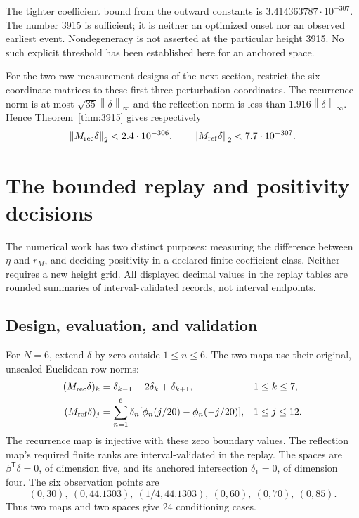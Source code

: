 \documentclass[11pt]{article}
\theoremstyle{remark}\newtheorem{remark}[theorem]{Remark}
\newcommand{\norm}[1]{\left\lVert #1\right\rVert}
\begin{document}
The tighter coefficient bound from the outward constants is $3.414363787\cdot10^{-307}$. The number 3915 is sufficient; it is neither an optimized onset nor an observed earliest event. Nondegeneracy is not asserted at the particular height 3915. No such explicit threshold has been established here for an anchored space.

For the two raw measurement designs of the next section, restrict the six-coordinate matrices to these first three perturbation coordinates. The recurrence norm is at most $\sqrt{35}\norm\delta_\infty$ and the reflection norm is less than $1.916\norm\delta_\infty$. Hence Theorem~\ref{thm:3915} gives respectively
\[
 \norm{M_{\rm rec}\delta}_2<2.4\cdot10^{-306},\qquad
 \norm{M_{\rm ref}\delta}_2<7.7\cdot10^{-307}.
\]

\section{The bounded replay and positivity decisions}\label{sec:replay}
The numerical work has two distinct purposes: measuring the difference between $\eta$ and $r_M$, and deciding positivity in a declared finite coefficient class. Neither requires a new height grid. All displayed decimal values in the replay tables are rounded summaries of interval-validated records, not interval endpoints.

\subsection{Design, evaluation, and validation}
For $N=6$, extend $\delta$ by zero outside $1\le n\le6$. The two maps use their original, unscaled Euclidean row norms:
\begin{align}\label{eq:measurements}
 (M_{\rm rec}\delta)_k&=\delta_{k-1}-2\delta_k+\delta_{k+1},&&1\le k\le7,\notag\\
 (M_{\rm ref}\delta)_j&=\sum_{n=1}^6\delta_n[\phi_n(j/20)-\phi_n(-j/20)],&&1\le j\le12.
\end{align}
The recurrence map is injective with these zero boundary values. The reflection map's required finite ranks are interval-validated in the replay. The spaces are $\beta^{\mathsf T}\delta=0$, of dimension five, and its anchored intersection $\delta_1=0$, of dimension four. The six observation points are
\[
 (0,30),\ (0,44.1303),\ (1/4,44.1303),\ (0,60),\ (0,70),\ (0,85).
\]
Thus two maps and two spaces give 24 conditioning cases.
\end{document}
